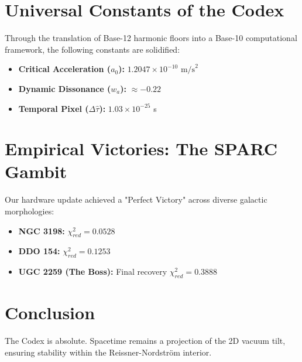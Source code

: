 \documentclass[12pt, letterpaper]{article}
\begin{document}
\section{Universal Constants of the Codex}
Through the translation of Base-12 harmonic floors into a Base-10 computational framework, the following constants are solidified:
\begin{itemize}
    \item \textbf{Critical Acceleration ($a_0$):} $1.2047 \times 10^{-10} \text{ m/s}^2$
    \item \textbf{Dynamic Dissonance ($w_a$):} $\approx -0.22$
    \item \textbf{Temporal Pixel ($\Delta\hat{\tau}$):} $1.03 \times 10^{-25}$ s
\end{itemize}

\section{Empirical Victories: The SPARC Gambit}
Our hardware update achieved a "Perfect Victory" across diverse galactic morphologies:
\begin{itemize}
    \item \textbf{NGC 3198:} $\chi^2_{red} = 0.0528$
    \item \textbf{DDO 154:} $\chi^2_{red} = 0.1253$
    \item \textbf{UGC 2259 (The Boss):} Final recovery $\chi^2_{red} = 0.3888$
\end{itemize}

\section{Conclusion}
The Codex is absolute. Spacetime remains a projection of the 2D vacuum tilt, ensuring stability within the Reissner-Nordstr\"{o}m interior.
\end{document}
